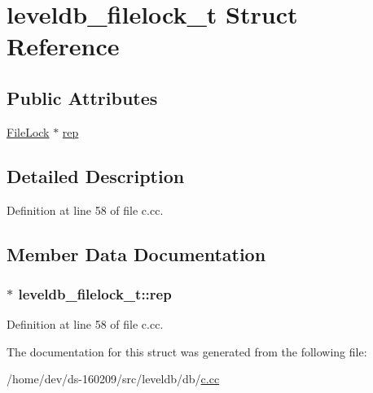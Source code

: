 \hypertarget{structleveldb__filelock__t}{}\section{leveldb\+\_\+filelock\+\_\+t Struct Reference}
\label{structleveldb__filelock__t}
\subsection*{Public Attributes}
\begin{DoxyCompactItemize}
\item 
\hyperlink{classleveldb_1_1_file_lock}{File\+Lock} $\ast$ \hyperlink{structleveldb__filelock__t_a6c341dd7282427215e6b3ba47871a4f5}{rep}
\end{DoxyCompactItemize}


\subsection{Detailed Description}


Definition at line 58 of file c.\+cc.



\subsection{Member Data Documentation}
\hypertarget{structleveldb__filelock__t_a6c341dd7282427215e6b3ba47871a4f5}{}
\subsubsection[{rep}]{$\ast$ leveldb\+\_\+filelock\+\_\+t\+::rep}\label{structleveldb__filelock__t_a6c341dd7282427215e6b3ba47871a4f5}


Definition at line 58 of file c.\+cc.



The documentation for this struct was generated from the following file\+:\begin{DoxyCompactItemize}
\item 
/home/dev/ds-\/160209/src/leveldb/db/\hyperlink{c_8cc}{c.\+cc}\end{DoxyCompactItemize}
